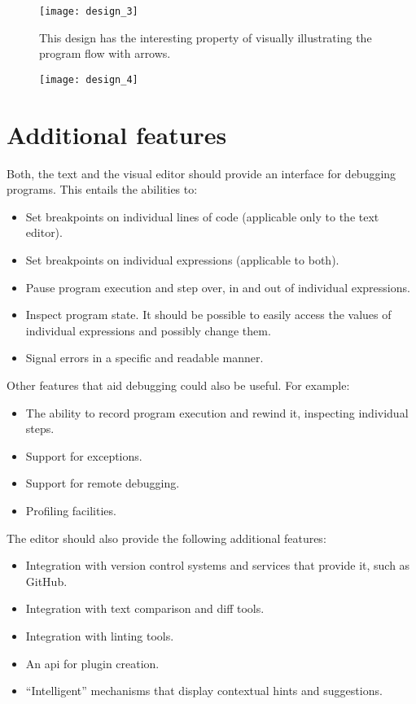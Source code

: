 \begin{figure}[h!]
\centering \texttt{[image: design\_3]}
\caption{This design has the interesting property of visually illustrating the
  program flow with arrows.}
\label{fig:design_3}
\end{figure}

\begin{figure}[h!]
\centering \texttt{[image: design\_4]}
\caption{}
\label{fig:design_4}
\end{figure}

\section{Additional features}
Both, the text and the visual editor should provide an interface for debugging programs. This entails the abilities to:
\begin{itemize}
\item Set breakpoints on individual lines of code (applicable only to the text editor).
\item Set breakpoints on individual expressions (applicable to both).
\item Pause program execution and step over, in and out of individual expressions.
\item Inspect program state. It should be possible to easily access the values of individual expressions and possibly change them.
\item Signal errors in a specific and readable manner.
\end{itemize}

Other features that aid debugging could also be useful. For example:
\begin{itemize}
\item The ability to record program execution and rewind it, inspecting individual steps.
\item Support for exceptions.
\item Support for remote debugging.
\item Profiling facilities.
\end{itemize}

The editor should also provide the following additional features:
\begin{itemize}
\item Integration with version control systems and services that provide it, such as GitHub.
\item Integration with text comparison and diff tools.
\item Integration with linting tools. 
\item An \acrlong{api} for plugin creation.
\item ``Intelligent'' mechanisms that display contextual hints and suggestions.
\end{itemize}
 